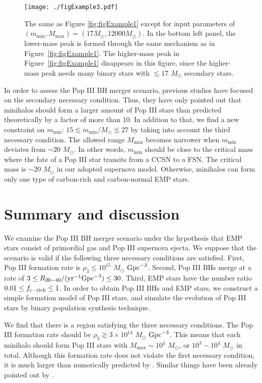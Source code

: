 \documentclass[pdftex]{pasj01}
\newcommand{\msun}{M_\odot}
\newcommand{\pyr}{{\rm yr}^{-1}}
\newcommand{\cgpc}{{\rm Gpc}^{-3}}
\newcommand{\dthree}{\rho_{3}}
\newcommand{\mlmax}{M_{\max}}
\newcommand{\msmin}{m_{\min}}
\newcommand{\ratetarget}{R_{20-40}}
\newcommand{\fcemp}{f_{\rm c-rich}}
\begin{document}
\begin{figure*}
 \begin{center}
  \texttt{[image: ./figExample3.pdf]} 
 \end{center}
\caption{The same as Figure \ref{fig:figExample1} except for input
  parameters of $(\msmin, \mlmax)=(17\msun,12000\msun)$. In the bottom
  left panel, the lower-mass peak is formed through the same mechanism
  as in Figure~\ref{fig:figExample1}. The higher-mass peak in
  Figure~\ref{fig:figExample1} disappears in this figure, since the
  higher-mass peak needs many binary stars with $\lesssim 17$ $\msun$
  secondary stars.} \label{fig:figExample3}
\end{figure*}

In order to assess the Pop III BH merger scenario, previous studies
have focused on the secondary necessary condition. Thus, they have
only pointed out that minihalos should form a larger amount of Pop III
stars than predicted theoretically by a factor of more than 10. In
addition to that, we find a new constraint on $\msmin$: $15 \lesssim
\msmin/\msun \lesssim 27$ by taking into account the third necessary
condition. The allowed range $\mlmax$ becomes narrower when $\msmin$
deviates from $\sim 20$ $\msun$. In other words, $\msmin$ should be
close to the critical mass where the fate of a Pop III star transits
from a CCSN to a FSN. The critical mass is $\sim 20$ $\msun$ in our
adopted supernova model. Otherwise, minihalos can form only one type
of carbon-rich and carbon-normal EMP stars.

\section{Summary and discussion}
\label{sec:SummaryAndDiscussion}

We examine the Pop III BH merger scenario under the hypothesis that
EMP stars consist of primordial gas and Pop III supernova ejecta. We
suppose that the scenario is valid if the following three necessary
conditions are satisfied. First, Pop III formation rate is $\dthree
\le 10^{15}$ $\msun$ $\cgpc$. Second, Pop III BHs merge at a rate of
$3 \le \ratetarget/(\pyr \cgpc) \le 30$. Third, EMP stars have the
number ratio $0.01 \le \fcemp \le 1$. In order to obtain Pop III BHs
and EMP stars, we construct a simple formation model of Pop III stars,
and simulate the evolution of Pop III stars by binary population
synthesis technique.

We find that there is a region satisfying the three necessary
conditions. The Pop III formation rate should be $\dthree \gtrsim 3
\times 10^{14}$ $\msun$ $\cgpc$. This means that each minihalo should
form Pop III stars with $\mlmax \sim 10^4$ $\msun$, or $10^3 - 10^4$
$\msun$ in total. Although this formation rate does not violate the
first necessary condition, it is much larger than numerically
predicted by \citet{2020MNRAS.492.4386S}. Similar things have been
already pointed out by \citet{2016MNRAS.460L..74H}.
\end{document}
